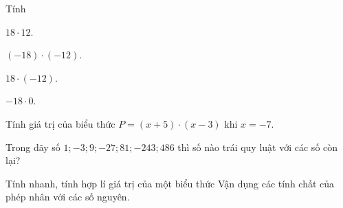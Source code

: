 \begin{vd}%
Tính
\begin{enumEX}{2}
	\item $ 18 \cdot 12 $.
	\item $ (-18) \cdot (-12) $.
	\item $ 18 \cdot (-12) $.
	\item $ -18 \cdot 0 $.
\end{enumEX}
\end{vd}

\begin{vd}%
Tính giá trị của biểu thức $ P=(x+5) \cdot (x-3) $ khi $ x=-7 $.
\end{vd}

\begin{vd}%
Trong dãy số $ 1; -3; 9; -27; 81; -243; 486 $ thì số nào trái quy luật với các số còn lại?
\end{vd}


\begin{dang}{Tính nhanh, tính hợp lí giá trị của một biểu thức}
Vận dụng các tính chất của phép nhân với các số nguyên.
\end{dang}


